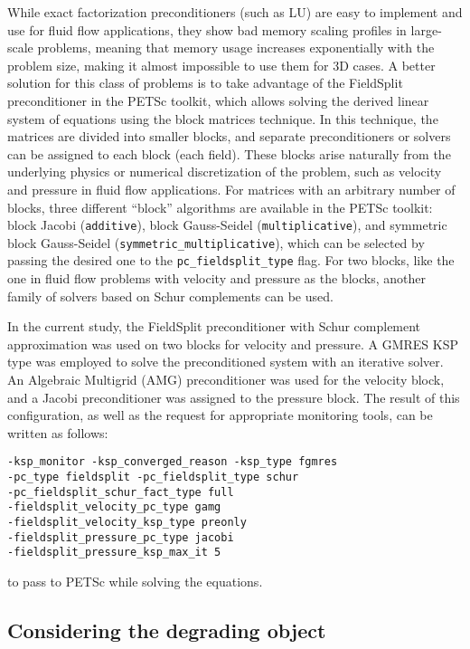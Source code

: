 While exact factorization preconditioners (such as LU) are easy to implement and use for fluid flow applications, they show bad memory scaling profiles in large-scale problems, meaning that memory usage increases exponentially with the problem size, making it almost impossible to use them for 3D cases. A better solution for this class of problems is to take advantage of the FieldSplit preconditioner in the {PETSc} toolkit, which allows solving the derived linear system of equations using the block matrices technique. In this technique, the matrices are divided into smaller blocks, and separate preconditioners or solvers can be assigned to each block (each field). These blocks arise naturally from the underlying physics or numerical discretization of the problem, such as velocity and pressure in fluid flow applications. For matrices with an arbitrary number of blocks, three different ``block'' algorithms are available in the {PETSc} toolkit: block Jacobi (\verb|additive|), block Gauss-Seidel (\verb|multiplicative|), and symmetric block Gauss-Seidel (\verb|symmetric_multiplicative|), which can be selected by passing the desired one to the \verb|pc_fieldsplit_type| flag. For two blocks, like the one in fluid flow problems with velocity and pressure as the blocks, another family of solvers based on Schur complements can be used.

In the current study, the FieldSplit preconditioner with Schur complement approximation was used on two blocks for velocity and pressure. A {GMRES} {KSP} type \cite{Saad1986} was employed to solve the preconditioned system with an iterative solver. An Algebraic Multigrid ({AMG}) preconditioner \cite{mccormick1987} was used for the velocity block, and a Jacobi preconditioner was assigned to the pressure block. The result of this configuration, as well as the request for appropriate monitoring tools, can be written as follows:
\begin{verbatim}
-ksp_monitor -ksp_converged_reason -ksp_type fgmres
-pc_type fieldsplit -pc_fieldsplit_type schur
-pc_fieldsplit_schur_fact_type full
-fieldsplit_velocity_pc_type gamg
-fieldsplit_velocity_ksp_type preonly
-fieldsplit_pressure_pc_type jacobi
-fieldsplit_pressure_ksp_max_it 5 \end{verbatim}
to pass to {PETSc} while solving the equations.


\subsection{Considering the degrading object}

